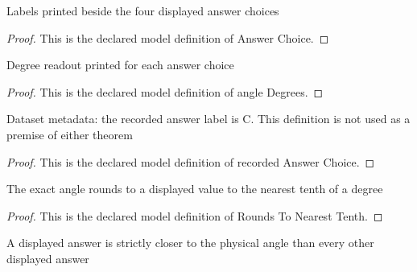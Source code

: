 \begin{definition}
  \label{def:physics:phyx-mini-0744:phyxminiproblems-problemphyxmini0744-answerchoice}
  Labels printed beside the four displayed answer choices
\end{definition}
\begin{proof}
  This is the declared model definition of Answer Choice.
\end{proof}
\begin{definition}
  \label{def:physics:phyx-mini-0744:phyxminiproblems-problemphyxmini0744-answerchoice-angledegrees}
  Degree readout printed for each answer choice
\end{definition}
\begin{proof}
  This is the declared model definition of angle Degrees.
\end{proof}
\begin{definition}
  \label{def:physics:phyx-mini-0744:phyxminiproblems-problemphyxmini0744-recordedanswerchoice}
  Dataset metadata: the recorded answer label is C. This definition is not used as a premise of either theorem
\end{definition}
\begin{proof}
  This is the declared model definition of recorded Answer Choice.
\end{proof}
\begin{definition}
  \label{def:physics:phyx-mini-0744:phyxminiproblems-problemphyxmini0744-roundstonearesttenth}
  The exact angle rounds to a displayed value to the nearest tenth of a degree
\end{definition}
\begin{proof}
  This is the declared model definition of Rounds To Nearest Tenth.
\end{proof}
\begin{definition}
  \label{def:physics:phyx-mini-0744:phyxminiproblems-problemphyxmini0744-isnearestanswerchoice}
  A displayed answer is strictly closer to the physical angle than every other displayed answer
\end{definition}
